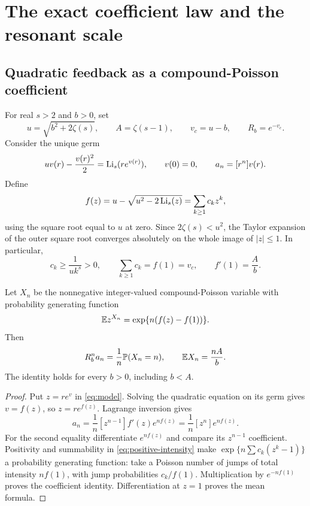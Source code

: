\section{The exact coefficient law and the resonant scale}
\label{sec:model}

\subsection{Quadratic feedback as a compound-Poisson coefficient}

For real $s>2$ and $b>0$, set
\begin{equation}\label{eq:parameters}
 u=\sqrt{b^2+2\zeta(s)},\qquad
 A=\zeta(s-1),\qquad v_c=u-b,\qquad R_b=e^{-v_c}.
\end{equation}
Consider the unique germ
\begin{equation}\label{eq:model}
 uv(r)-\frac{v(r)^2}{2}=\operatorname{Li}_s(re^{v(r)}),\qquad v(0)=0,
 \qquad a_n=[r^n]v(r).
\end{equation}
Define
\begin{equation}\label{eq:f}
 f(z)=u-\sqrt{u^2-2\operatorname{Li}_s(z)}=\sum_{k\ge1}c_kz^k,
\end{equation}
using the square root equal to $u$ at zero. Since
$2\zeta(s)<u^2$, the Taylor expansion of the outer square root converges
absolutely on the whole image of $|z|\le1$. In particular,
\begin{equation}\label{eq:positive-intensity}
 c_k\ge\frac1{u k^s}>0,\qquad
 \sum_{k\ge1}c_k=f(1)=v_c,\qquad f'(1)=\frac Ab.
\end{equation}

\begin{proposition}
\label{prop:poisson}
Let $X_n$ be the nonnegative integer-valued compound-Poisson variable
with probability generating function
\begin{equation}\label{eq:pgf}
 \mathbb E z^{X_n}=\exp\{n(f(z)-f(1))\}.
\end{equation}
Then
\begin{equation}\label{eq:probability-identity}
 R_b^n a_n=\frac1n\mathbb P(X_n=n),\qquad
 \mathbb E X_n=\frac{nA}{b}.
\end{equation}
The identity holds for every $b>0$, including $b<A$.
\end{proposition}

\begin{proof}
Put $z=re^{v}$ in \eqref{eq:model}. Solving the quadratic equation
on its germ gives $v=f(z)$, so $z=re^{f(z)}$. Lagrange inversion gives
\[
 a_n=\frac1n[z^{n-1}]f'(z)e^{nf(z)}
     =\frac1n[z^n]e^{nf(z)}.
\]
For the second equality differentiate $e^{nf(z)}$ and compare its
$z^{n-1}$ coefficient. Positivity and summability in
\eqref{eq:positive-intensity} make
$\exp\{n\sum c_k(z^k-1)\}$ a probability generating function:
take a Poisson number of jumps of total intensity $nf(1)$, with
jump probabilities $c_k/f(1)$. Multiplication by $e^{-nf(1)}$
proves the coefficient identity. Differentiation at $z=1$ proves
the mean formula.
\end{proof}

